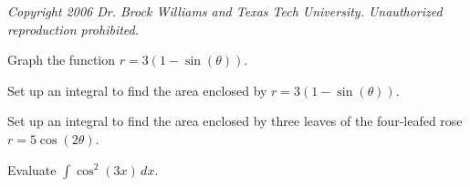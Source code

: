 \documentclass{exam}[12pt]
\begin{document}
\pagestyle{head}

\extraheadheight{.7in}
\extrafootheight{-1in} 
\small{\textit{
Copyright 2006 Dr. Brock Williams and
Texas Tech University.  Unauthorized reproduction prohibited.}}

\begin{questions}
\large{

\question Graph the function $r=3(1 - \sin(\theta))$.
\vspace{2.2in}

\question Set up an integral to find the area enclosed by
 $r=3(1-\sin(\theta))$.
\vspace{2.2in}

\question Set up an integral to find the area enclosed by three leaves
of the four-leafed rose $r=5\cos(2\theta)$.
\vspace{2in}

\question[6] Evaluate $\int \cos^2(3x)\, dx$.
\vspace{3in}

}
\end{questions}
\end{document}
